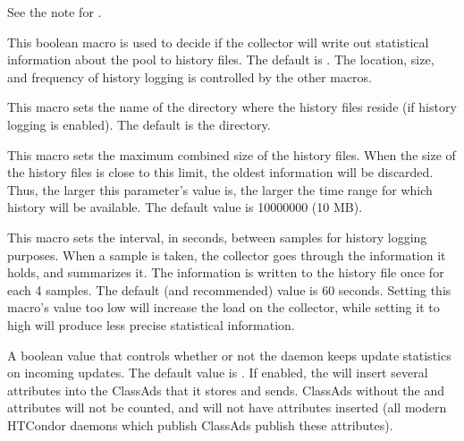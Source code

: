 \begin{description}
  \Note See the note for .

\label{param:KeepPoolHistory}
\item[\Macro{KEEP\_POOL\_HISTORY}]
  This boolean macro is used to decide if the collector will write
  out statistical information about the pool to history files.
  The default is .
  The location, size, and frequency of history logging is controlled
  by the other macros.

\label{param:PoolHistoryDir}
\item[\Macro{POOL\_HISTORY\_DIR}]
  This macro sets the name of the directory where the history
  files reside (if history logging is enabled).
  The default is the  directory.

\label{param:PoolHistoryMaxStorage} 
\item[\Macro{POOL\_HISTORY\_MAX\_STORAGE}]
  This macro sets the maximum combined size of the history files.
  When the size of the history files is close to this limit, the oldest
  information will be discarded.
  Thus, the larger this parameter's value is, the larger the time
  range for which history will be available.  The default value is
  10000000 (10 MB).

\label{param:PoolHistorySamplingInterval}
\item[\Macro{POOL\_HISTORY\_SAMPLING\_INTERVAL}]
  This macro sets the interval, in seconds, between samples for
  history logging purposes. 
  When a sample is taken, the collector goes through the information
  it holds, and summarizes it.
  The information is written to the history file once for each 4
  samples.
  The default (and recommended) value is 60 seconds. Setting this
  macro's value too low will increase the load on the collector,
  while setting it to high will produce less precise statistical
  information.

\label{param:CollectorDaemonStats}
\item[\Macro{COLLECTOR\_DAEMON\_STATS}]
  A boolean value that controls whether or not the  daemon
  keeps update statistics on incoming updates.  
  The default value is .
  If enabled, the  will insert several attributes
  into the ClassAds that it stores and sends.  ClassAds without the
   and  attributes will not
  be counted, and will not have attributes inserted (all modern HTCondor
  daemons which publish ClassAds publish these attributes).


\end{description}
